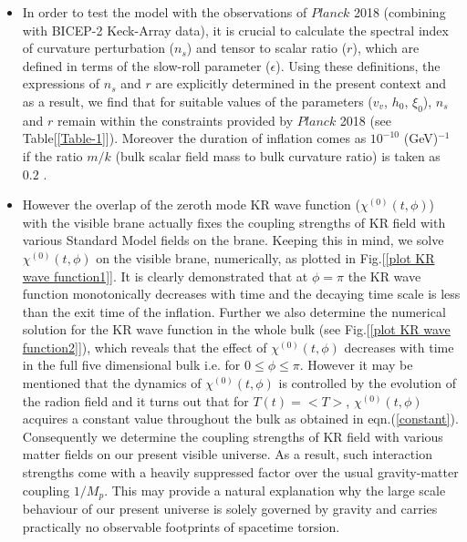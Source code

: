 \documentclass[a4paper]{article}
\begin{document}
\begin{itemize}
 \item In order to test the model with the observations of $Planck$ 2018 (combining with BICEP-2 Keck-Array data), it is crucial to calculate 
 the spectral index of curvature perturbation ($n_s$) and tensor to scalar ratio ($r$), which are defined in terms of the slow-roll 
 parameter ($\epsilon$). Using these definitions, the expressions of $n_s$ and $r$ are explicitly determined in the present context and 
 as a result, we find that for suitable values of the parameters ($v_v$, $h_0$, $\xi_0$), $n_s$ and $r$ 
 remain within the constraints provided by $Planck$ 2018 \cite{Planck} (see Table[\ref{Table-1}]). Moreover the duration of inflation comes as 
 $10^{-10}$ (GeV)$^{-1}$ if the ratio $m/k$ (bulk scalar field mass to bulk curvature ratio) is taken as $0.2$ \cite{GW}.
 
 \item However the overlap of the zeroth mode KR wave function ($\chi^{(0)}(t,\phi)$) with the visible brane actually 
 fixes the coupling strengths of KR field with various Standard Model fields on the brane. Keeping this in mind, we 
 solve $\chi^{(0)}(t,\phi)$ on the visible brane, numerically, as plotted in Fig.[\ref{plot KR wave function1}]. 
 It is clearly demonstrated 
 that at $\phi=\pi$ the KR wave function monotonically decreases with time and the decaying time scale is less than the exit time of the inflation. 
 Further we also determine the numerical solution for the KR wave function in the whole bulk (see Fig.[\ref{plot KR wave function2}]), 
 which reveals 
 that the effect of $\chi^{(0)}(t,\phi)$ decreases with time in the full five dimensional bulk i.e. for $0 \leq \phi \leq \pi$. 
 However it may be mentioned that the dynamics of $\chi^{(0)}(t,\phi)$ is controlled by the evolution of the radion field 
 and it turns out that for $T(t)=<T>$, $\chi^{(0)}(t,\phi)$ acquires a constant value throughout the bulk as obtained in eqn.(\ref{constant}). 
 Consequently we determine the coupling strengths of KR field with various matter fields on our present visible universe. As a result, 
 such interaction strengths come with a heavily suppressed factor over the usual gravity-matter coupling $1/M_p$. 
 This may provide a natural explanation why the large scale behaviour of our 
present universe is solely governed by gravity and carries practically no observable footprints of spacetime torsion.


\end{itemize}
\end{document}
